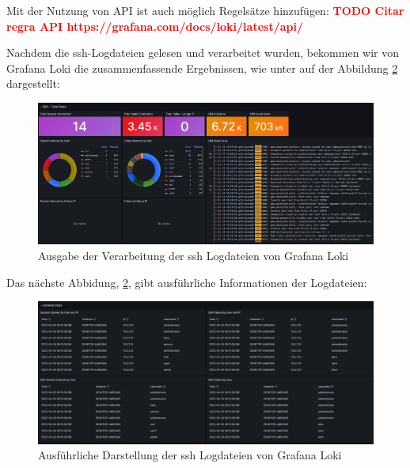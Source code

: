 Mit der Nutzung von \gls{API} ist auch möglich Regelsätze hinzufügen:
\textcolor{red}{\textbf{TODO Citar regra API https://grafana.com/docs/loki/latest/api/}}

\newpage
{} 
\thispagestyle{lscape}
\begin{landscape}
   Nachdem die \gls{ssh}-Logdateien gelesen und verarbeitet wurden, bekommen wir von Grafana Loki die zusammenfassende Ergebnissen, wie unter auf der Abbildung \ref{fig:Grafana_DetailedStats} dargestellt:
    \begin{figure}[H]
        \centerline{\includegraphics[width=1.7\textwidth]{assets/GrafanaLoki_ssh}}
        \caption[Ausgabe der Verarbeitung der \gls{ssh} Logdateien von Grafana Loki]
        {Ausgabe der Verarbeitung der \gls{ssh} Logdateien von Grafana Loki}
        \label{fig:Grafana_Grafik}
        \centering
    \end{figure} 
\end{landscape}
\restoregeometry

\newpage
{} 
\thispagestyle{lscape}
\begin{landscape}
   Das nächste Abbidung, \ref{fig:Grafana_DetailedStats}, gibt ausführliche Informationen der Logdateien:
    \begin{figure}[H]
        \centerline{\includegraphics[width=1.7\textwidth]{assets/GrafanaLoki_sshDetailed.png}}
        \caption[Ausführliche Darstellung der \gls{ssh} Logdateien von Grafana Loki]
        {Ausführliche Darstellung der \gls{ssh} Logdateien von Grafana Loki}
        \label{fig:Grafana_DetailedStats}
        \centering
    \end{figure} 
\end{landscape}
\restoregeometry

